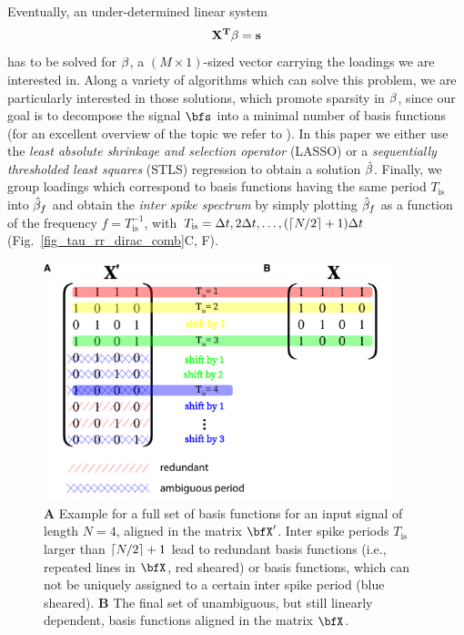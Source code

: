 \noindent Eventually, an under-determined linear system
\begin{equation}
\bf{X}^T\bf{\beta}=\bf{s}
\label{eq_linear_system}
\end{equation}  
has to be solved for $\bf{\beta}$, a $(M\times 1)$-sized vector carrying the loadings we are interested in. Along a variety of algorithms which can solve this problem, we are 
particularly interested in those solutions, which promote sparsity in $\bf{\beta}$, since our goal is to decompose the signal $\bfs$ into a minimal number of basis 
functions (for an excellent overview of the topic we refer to \citet{Brunton2019}). In this paper we either use the \textit{least absolute shrinkage and selection operator} 
(LASSO) \cite{Tibshirani1996} or a \textit{sequentially thresholded least squares} (STLS) regression \cite{Brunton2016,Brunton2019} to obtain a solution $\hat{\bf{\beta}}$. Finally, we group loadings 
which correspond to basis functions having the same period 
$T_\text{is}$ into $\hat{\bf{\beta}}_f$ and obtain the 
\textit{inter spike spectrum} by simply plotting $\hat{\bf{\beta}}_f$ as a function of the frequency $f=T_\text{is}^{-1}$, with $T_\text{is}=\Delta t, 2\Delta t, \dots, (\ceil*{N/2}+1) \Delta t$ 
(Fig.~\ref{fig_tau_rr_dirac_comb}C, F).

\begin{figure}
\centering
\includegraphics[width=0.9\textwidth]{./figures/fig_tau_rr_basis_functions}
\caption{\textbf{A} Example for a full set of basis functions for an input signal of length $N=4$, aligned in the matrix $\bfX'$. Inter spike periods $T_{\text{is}}$ larger 
than $\ceil*{N/2}+1$ lead to redundant basis functions (i.e., repeated lines in $\bfX$, red sheared) or basis functions, which can not be uniquely assigned to a certain inter spike period 
(blue sheared). \textbf{B} The final set of unambiguous, but still linearly dependent, basis functions aligned in the matrix $\bfX$.} \label{fig_tau_rr_basis_functions}
\end{figure}

